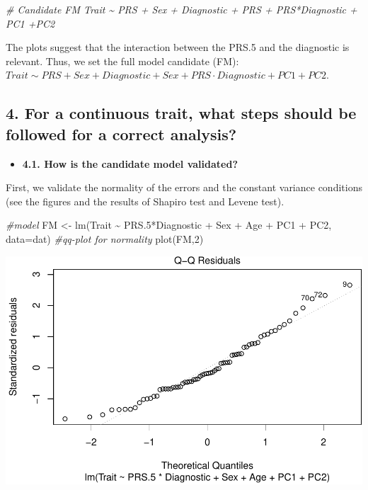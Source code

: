 \documentclass[
]{article}
\newenvironment{Shaded}{\begin{snugshade}}{\end{snugshade}}
\newcommand{\AttributeTok}[1]{\textcolor[rgb]{0.77,0.63,0.00}{#1}}
\newcommand{\CommentTok}[1]{\textcolor[rgb]{0.56,0.35,0.01}{\textit{#1}}}
\newcommand{\DecValTok}[1]{\textcolor[rgb]{0.00,0.00,0.81}{#1}}
\newcommand{\FloatTok}[1]{\textcolor[rgb]{0.00,0.00,0.81}{#1}}
\newcommand{\FunctionTok}[1]{\textcolor[rgb]{0.00,0.00,0.00}{#1}}
\newcommand{\NormalTok}[1]{#1}
\newcommand{\OtherTok}[1]{\textcolor[rgb]{0.56,0.35,0.01}{#1}}
\newcommand{\SpecialCharTok}[1]{\textcolor[rgb]{0.00,0.00,0.00}{#1}}
\providecommand{\tightlist}{%
  \setlength{\itemsep}{0pt}\setlength{\parskip}{0pt}}
\begin{document}
\begin{Shaded}
\begin{Highlighting}[]
\CommentTok{\# Candidate FM Trait \textasciitilde{} PRS + Sex + Diagnostic + PRS + PRS*Diagnostic + PC1 +PC2}
\end{Highlighting}
\end{Shaded}

The plots suggest that the interaction between the PRS.5 and the
diagnostic is relevant. Thus, we set the full model candidate (FM):
\(Trait \sim PRS + Sex + Diagnostic + Sex + PRS \cdot Diagnostic + PC1 +PC2\).

\hypertarget{for-a-continuous-trait-what-steps-should-be-followed-for-a-correct-analysis}{%
\subsection{4. For a continuous trait, what steps should be followed for
a correct
analysis?}\label{for-a-continuous-trait-what-steps-should-be-followed-for-a-correct-analysis}}

\begin{itemize}
\tightlist
\item
  \textbf{4.1. How is the candidate model validated?}
\end{itemize}

First, we validate the normality of the errors and the constant variance
conditions (see the figures and the results of Shapiro test and Levene
test).

\begin{Shaded}
\begin{Highlighting}[]
\CommentTok{\#model}
\NormalTok{FM }\OtherTok{\textless{}{-}} \FunctionTok{lm}\NormalTok{(Trait }\SpecialCharTok{\textasciitilde{}}\NormalTok{ PRS}\FloatTok{.5}\SpecialCharTok{*}\NormalTok{Diagnostic }\SpecialCharTok{+}\NormalTok{ Sex }\SpecialCharTok{+}\NormalTok{ Age }\SpecialCharTok{+}\NormalTok{ PC1 }\SpecialCharTok{+}\NormalTok{ PC2, }\AttributeTok{data=}\NormalTok{dat)}
\CommentTok{\#qq{-}plot for normality }
\FunctionTok{plot}\NormalTok{(FM,}\DecValTok{2}\NormalTok{)   }
\end{Highlighting}
\end{Shaded}

\includegraphics{WorkingExample2_code_files/figure-latex/unnamed-chunk-7-1.pdf}
\end{document}
